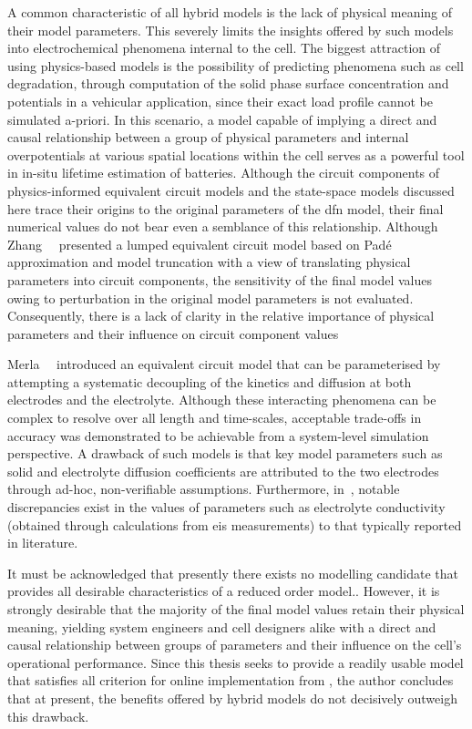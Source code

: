 A common characteristic of all hybrid models  is the lack of physical meaning of
their model parameters. This severely limits the insights offered by such models
into electrochemical phenomena  internal to the cell. The  biggest attraction of
using  physics-based models  is  the possibility  of  predicting phenomena  such
as  cell degradation,  \eg{}  through  computation of  the  solid phase  surface
concentration and potentials in a  vehicular application, since their exact load
profile  cannot be  simulated a-priori.  In this  scenario, a  model capable  of
implying a direct and causal relationship between a group of physical parameters
and internal overpotentials at various  spatial locations within the cell serves
as  a  powerful tool  in  in-situ  lifetime  estimation of  batteries.  Although
the  circuit  components  of  physics-informed  equivalent  circuit  models  and
the  state-space models  discussed  here  trace their  origins  to the  original
parameters of  the \gls{dfn}  model, their  final numerical  values do  not bear
even a  semblance of this relationship.  Although Zhang~\etal{}~\cite{Zhang2017}
presented a  lumped equivalent  circuit model based  on Padé  approximation and
model truncation  with a  view of translating  physical parameters  into circuit
components, the sensitivity  of the final model values owing  to perturbation in
the original model parameters is not evaluated. Consequently, there is a lack of
clarity in the relative importance of physical parameters and their influence on
circuit component values

Merla~\etal{}~\cite{Merla2018} introduced  an equivalent circuit model  that can
be  parameterised by  attempting a  systematic  decoupling of  the kinetics  and
diffusion at  both electrodes  and the  electrolyte. Although  these interacting
phenomena can be complex to resolve  over all length and time-scales, acceptable
trade-offs in  accuracy was  demonstrated to be  achievable from  a system-level
simulation perspective. A  drawback of such models is that  key model parameters
such  as  solid  and  electrolyte   diffusion  coefficients  are  attributed  to
the  two electrodes  through  ad-hoc,  non-verifiable assumptions.  Furthermore,
in~\cite{Merla2018},  notable discrepancies  exist in  the values  of parameters
such as  electrolyte conductivity (obtained through  calculations from \gls{eis}
measurements)  to that  typically reported  in literature.

It must be acknowledged that presently  there exists no modelling candidate that
provides  all desirable  characteristics of  a reduced  order model.. However,
it is  strongly desirable  that the  majority of the  final model  values retain
their physical meaning, yielding system  engineers and cell designers alike with
a  direct  and  causal  relationship  between groups  of  parameters  and  their
influence  on  the  cell's  operational performance.  Since  this  thesis  seeks
to  provide a  readily  usable  model that  satisfies  all   criterion  for online implementation  from ,  the author
concludes  that  at present,  the  benefits  offered  by  hybrid models  do  not
decisively outweigh this drawback.

